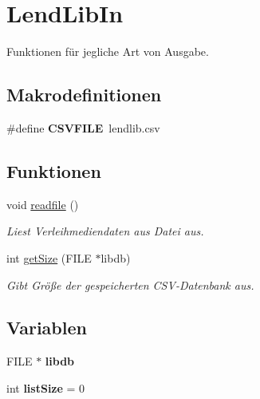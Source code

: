 \hypertarget{group___lend_lib_in}{}\section{Lend\+Lib\+In}
\label{group___lend_lib_in}


Funktionen für jegliche Art von Ausgabe.  


\subsection*{Makrodefinitionen}
\begin{DoxyCompactItemize}
\item 
\#define {\bfseries C\+S\+V\+F\+I\+LE}~lendlib.\+csv\hypertarget{group___lend_lib_in_ga09878b617b8ddec7d75c7a4e71718894}{}\label{group___lend_lib_in_ga09878b617b8ddec7d75c7a4e71718894}

\end{DoxyCompactItemize}
\subsection*{Funktionen}
\begin{DoxyCompactItemize}
\item 
void \hyperlink{group___lend_lib_in_gabd7e68463503c5745a70e1d19c66f812}{readfile} ()\hypertarget{group___lend_lib_in_gabd7e68463503c5745a70e1d19c66f812}{}\label{group___lend_lib_in_gabd7e68463503c5745a70e1d19c66f812}

\begin{DoxyCompactList}\small\item\em Liest Verleihmediendaten aus Datei aus. \end{DoxyCompactList}\item 
int \hyperlink{group___lend_lib_in_ga6630e38513358b73fa2ce1c1f6cb71cb}{get\+Size} (F\+I\+LE $\ast$libdb)
\begin{DoxyCompactList}\small\item\em Gibt Größe der gespeicherten C\+S\+V-\/\+Datenbank aus. \end{DoxyCompactList}\end{DoxyCompactItemize}
\subsection*{Variablen}
\begin{DoxyCompactItemize}
\item 
F\+I\+LE $\ast$ {\bfseries libdb}\hypertarget{group___lend_lib_in_ga7eaa119ac9f04253a1f58bb6b09f9df2}{}\label{group___lend_lib_in_ga7eaa119ac9f04253a1f58bb6b09f9df2}

\item 
int {\bfseries list\+Size} = 0\hypertarget{group___lend_lib_in_ga91f8b044f23c2395ba7c1ee942b2456c}{}\label{group___lend_lib_in_ga91f8b044f23c2395ba7c1ee942b2456c}

\end{DoxyCompactItemize}


